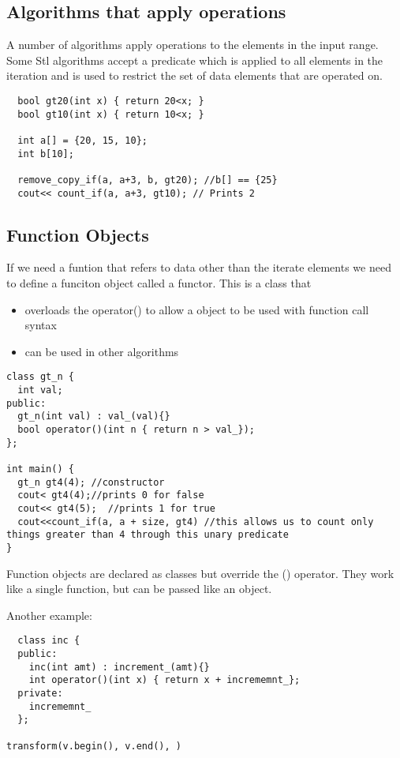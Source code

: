\documentclass[12pt]{article}
\begin{document}
\subsection*{Algorithms that apply operations}
A number of algorithms apply operations to the elements in the input range. Some Stl algorithms accept a predicate which is applied to all elements in the iteration and is used to restrict the set of data elements that are operated on.

\begin{lstlisting}
  bool gt20(int x) { return 20<x; }
  bool gt10(int x) { return 10<x; }

  int a[] = {20, 15, 10};
  int b[10];

  remove_copy_if(a, a+3, b, gt20); //b[] == {25}
  cout<< count_if(a, a+3, gt10); // Prints 2

\end{lstlisting}

\subsection*{Function Objects}
If we need a funtion that refers to data other than the iterate elements we need to define a funciton object called a functor. This is a class that
\begin{itemize}
  \item overloads the operator() to allow a object to be used with function call syntax
  \item can be used in other algorithms
\end{itemize}
\begin{lstlisting}
class gt_n {
  int val;
public:
  gt_n(int val) : val_(val){}
  bool operator()(int n { return n > val_});
};

int main() {
  gt_n gt4(4); //constructor
  cout< gt4(4);//prints 0 for false
  cout<< gt4(5);  //prints 1 for true
  cout<<count_if(a, a + size, gt4) //this allows us to count only things greater than 4 through this unary predicate
}
\end{lstlisting}

Function objects are declared as classes but override the () operator. They work like a single function, but can be passed like an object.

Another example:
\begin{lstlisting}
  class inc {
  public:
    inc(int amt) : increment_(amt){}
    int operator()(int x) { return x + incrememnt_};
  private:
    incrememnt_
  };

transform(v.begin(), v.end(), )
\end{lstlisting}
\end{document}
